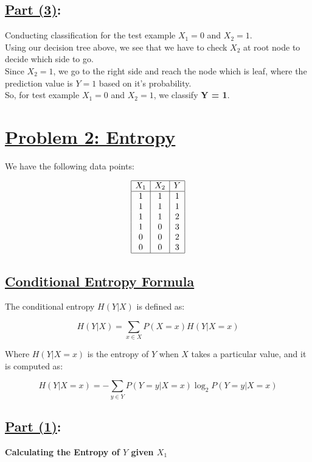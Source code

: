 \documentclass[12pt]{article}
\begin{document}
\subsection*{\underline{Part (3)}:}
Conducting classification for the test example $X_1 = 0$ and $X_2 = 1$.\\
Using our decision tree above, we see that we have to check $X_2$ at root node to decide which side to go.\\
Since $X_2 = 1$, we go to the right side and reach the node which is leaf, where the prediction value is $Y = 1$ based on it's probability.\\
So, for test example $X_1 = 0$ and $X_2 = 1$, we classify \textbf{Y = 1}.

\section*{\underline{Problem 2: Entropy}}

We have the following data points:

\[
  \begin{array}{|c|c|c|}
    \hline
    X_1 & X_2 & Y \\
    \hline
    1   & 1   & 1 \\
    1   & 1   & 1 \\
    1   & 1   & 2 \\
    1   & 0   & 3 \\
    0   & 0   & 2 \\
    0   & 0   & 3 \\
    \hline
  \end{array}
\]

\subsection*{\underline{Conditional Entropy Formula}}

The conditional entropy \( H(Y|X) \) is defined as:

\[
  H(Y|X) = \sum_{x \in X} P(X = x) H(Y|X = x)
\]

Where \( H(Y|X = x) \) is the entropy of \( Y \) when \( X \) takes a particular value, and it is computed as:

\[
  H(Y|X = x) = - \sum_{y \in Y} P(Y = y | X = x) \log_2 P(Y = y | X = x)
\]

\subsection*{\underline{Part (1)}:}
\textbf{Calculating the Entropy of $Y$ given $X_1$}
\end{document}
